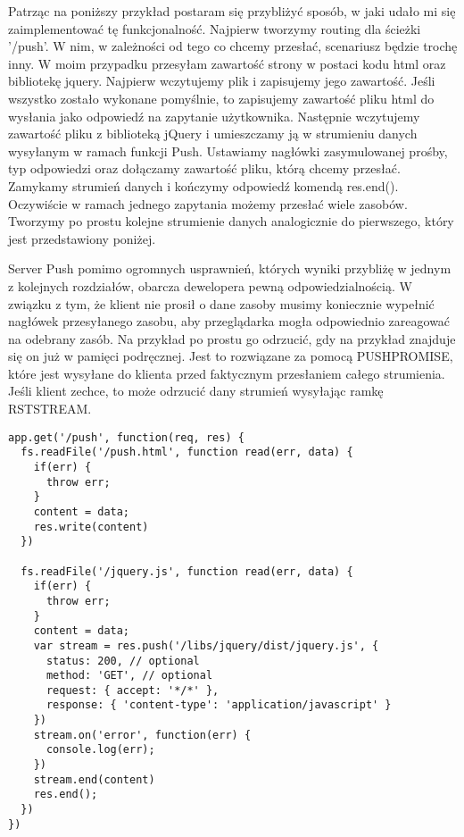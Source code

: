 \documentclass[a4paper,12pt,twoside,openany]{report}
\begin{document}
Patrząc na poniższy przykład postaram się przybliżyć sposób, w jaki udało mi się zaimplementować tę funkcjonalność.
Najpierw tworzymy routing dla ścieżki '/push'.
W nim, w zależności od tego co chcemy przesłać, scenariusz będzie trochę inny.
W moim przypadku przesyłam zawartość strony w postaci kodu html oraz bibliotekę jquery.
Najpierw wczytujemy plik i zapisujemy jego zawartość.
Jeśli wszystko zostało wykonane pomyślnie, to zapisujemy zawartość pliku html do wysłania jako odpowiedź na zapytanie użytkownika.
Następnie wczytujemy zawartość pliku z biblioteką jQuery i umieszczamy ją w strumieniu danych wysyłanym w ramach funkcji Push.
Ustawiamy nagłówki zasymulowanej prośby, typ odpowiedzi oraz dołączamy zawartość pliku, którą chcemy przesłać.
Zamykamy strumień danych i kończymy odpowiedź komendą res.end().
Oczywiście w ramach jednego zapytania możemy przesłać wiele zasobów.
Tworzymy po prostu kolejne strumienie danych analogicznie do pierwszego, który jest przedstawiony poniżej.

Server Push pomimo ogromnych usprawnień, których wyniki przybliżę w jednym z kolejnych rozdziałów, obarcza dewelopera pewną odpowiedzialnością.
W związku z tym, że klient nie prosił o dane zasoby musimy koniecznie wypełnić nagłówek przesyłanego zasobu, aby przeglądarka mogła odpowiednio zareagować na odebrany zasób.
Na przykład po prostu go odrzucić, gdy na przykład znajduje się on już w pamięci podręcznej.
Jest to rozwiązane za pomocą PUSH\textunderscore PROMISE, które jest wysyłane do klienta przed faktycznym przesłaniem całego strumienia.
Jeśli klient zechce, to może odrzucić dany strumień wysyłając ramkę RST\textunderscore STREAM.

\begin{lstlisting}
app.get('/push', function(req, res) {
  fs.readFile('/push.html', function read(err, data) {
    if(err) {
      throw err;
    }
    content = data;
    res.write(content)
  })

  fs.readFile('/jquery.js', function read(err, data) {
    if(err) {
      throw err;
    }
    content = data;
    var stream = res.push('/libs/jquery/dist/jquery.js', {
      status: 200, // optional
      method: 'GET', // optional
      request: { accept: '*/*' },
      response: { 'content-type': 'application/javascript' }
    })
    stream.on('error', function(err) {
      console.log(err);
    })
    stream.end(content)
    res.end();
  })
})
\end{lstlisting}
\end{document}
